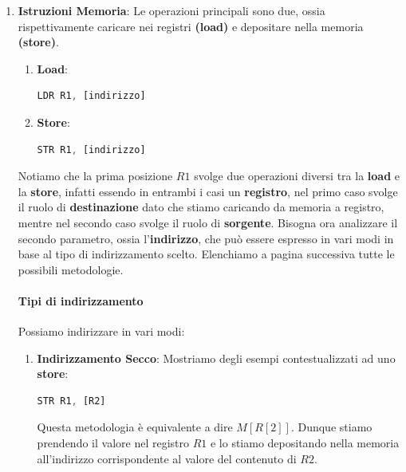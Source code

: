 \documentclass{article}
\begin{document}
\begin{enumerate}
\begin{enumerate}
\end{enumerate}

\item \textbf{Istruzioni Memoria}: Le operazioni principali sono due, ossia rispettivamente caricare nei registri \textbf{(load)} e depositare nella memoria \textbf{(store)}.

\begin{enumerate}
    \item \textbf{Load}:
\begin{lstlisting}[language = JavaScript]
    LDR R1, [indirizzo]
\end{lstlisting}
\vspace*{-20px} 
    \item \textbf{Store}:
\begin{lstlisting}[language = JavaScript]
    STR R1, [indirizzo]
\end{lstlisting}
\vspace*{-20px} 
\end{enumerate}

Notiamo che la prima posizione $R1$ svolge due operazioni diversi tra la \textbf{load} e la \textbf{store}, infatti essendo in entrambi i casi un \textbf{registro}, nel primo caso svolge il ruolo di \textbf{destinazione} dato che stiamo caricando da memoria a registro, mentre nel secondo caso svolge il ruolo di \textbf{sorgente}. Bisogna ora analizzare il secondo parametro, ossia l'\textbf{indirizzo}, che può essere espresso in vari modi in base al tipo di indirizzamento scelto. Elenchiamo a pagina successiva tutte le possibili metodologie.

\newpage

\paragraph{Tipi di indirizzamento} Possiamo indirizzare in vari modi:

\begin{enumerate}
\item \textbf{Indirizzamento Secco}: Mostriamo degli esempi contestualizzati ad uno \textbf{store}:
\begin{lstlisting}[language = JavaScript]
    STR R1, [R2]
\end{lstlisting}
\vspace*{-20px}

Questa metodologia è equivalente a dire $M[R[2]]$. Dunque stiamo prendendo il valore nel registro $R1$ e lo stiamo depositando nella memoria all'indirizzo corrispondente al valore del contenuto di $R2$.


\end{enumerate}
\end{enumerate}
\end{document}
